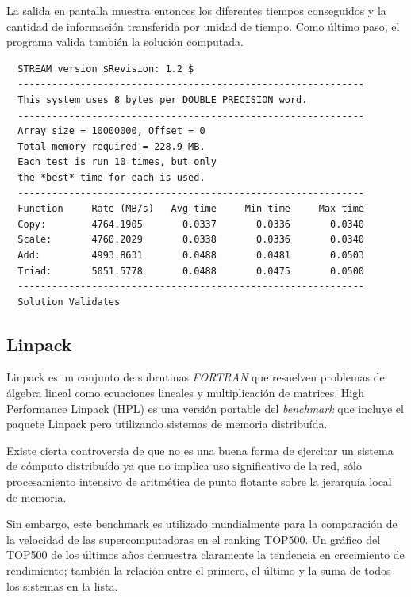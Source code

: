 \documentclass[a4paper]{report}
\begin{document}
La salida en pantalla muestra entonces los diferentes tiempos conseguidos y la cantidad de informaci\'on transferida por unidad de tiempo.
Como \'ultimo paso, el programa valida tambi\'en la soluci\'on computada.

\begin{verbatim}
  STREAM version $Revision: 1.2 $
  -------------------------------------------------------------
  This system uses 8 bytes per DOUBLE PRECISION word.
  -------------------------------------------------------------
  Array size = 10000000, Offset = 0
  Total memory required = 228.9 MB.
  Each test is run 10 times, but only
  the *best* time for each is used.
  -------------------------------------------------------------
  Function     Rate (MB/s)   Avg time     Min time     Max time
  Copy:        4764.1905       0.0337       0.0336       0.0340
  Scale:       4760.2029       0.0338       0.0336       0.0340
  Add:         4993.8631       0.0488       0.0481       0.0503
  Triad:       5051.5778       0.0488       0.0475       0.0500
  -------------------------------------------------------------
  Solution Validates
\end{verbatim}

\subsection{Linpack}

Linpack \cite{linpack} es un conjunto de subrutinas {\it FORTRAN} que resuelven
problemas de \'algebra lineal como ecuaciones lineales y multiplicaci\'on de
matrices. High Performance Linpack (HPL) \cite{hpl} es una versi\'on portable del {\it benchmark} que incluye
el paquete Linpack pero utilizando sistemas de memoria distribu\'ida.

\bigskip

Existe cierta controversia de que no es una buena forma de ejercitar un
sistema de c\'omputo distribu\'ido ya que no implica uso significativo de la
red, s\'olo procesamiento intensivo de aritm\'etica de punto flotante
sobre la jerarqu\'ia local de memoria.

\bigskip

Sin embargo, este benchmark es utilizado mundialmente para la comparaci\'on de la
velocidad de las supercomputadoras en el ranking TOP500. 
Un gr\'afico del TOP500 de los \'ultimos a\~nos demuestra claramente la
tendencia en crecimiento de rendimiento; tambi\'en la relaci\'on entre el primero, el último y la suma de todos los sistemas en la lista.
\end{document}
